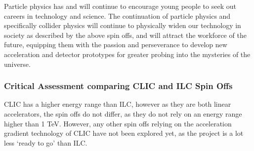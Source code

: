 Particle physics has and will continue to encourage young people to seek out careers in technology and science. The continuation of particle physics and specifically collider physics will continue to physically widen our technology in society as described by the above spin offs, and will attract the workforce of the future, equipping them with the passion and perseverance to develop new acceleration and detector prototypes for greater probing into the mysteries of the universe. \cite{ILC:WhyNeed}

\subsubsection{Critical Assessment comparing CLIC and ILC Spin Offs}

CLIC has a higher energy range than ILC, however as they are both linear accelerators, the spin offs do not differ, as they do not rely on an energy range higher than 1 TeV. However, any other spin offs relying on the acceleration gradient technology of CLIC have not been explored yet, as the project is a lot less `ready to go' than ILC.